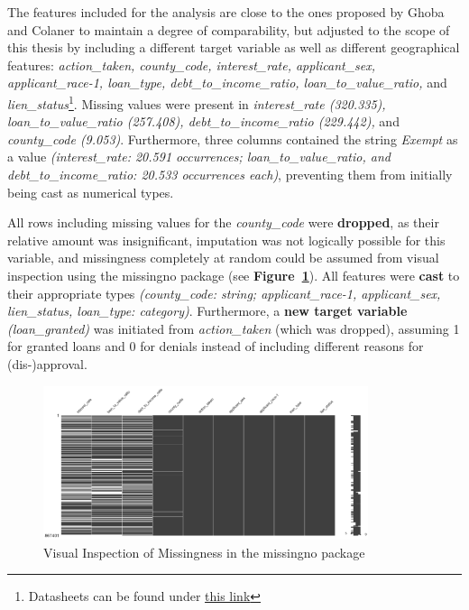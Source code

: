 The features included for the analysis are close to the ones proposed by Ghoba and Colaner to maintain a degree of comparability, but adjusted to the scope of this thesis by including a different target variable as well as different geographical features: 
\textit{action\_taken, county\_code, interest\_rate, applicant\_sex, applicant\_race-1, loan\_type, debt\_to\_income\_ratio, loan\_to\_value\_ratio,} and \textit{lien\_status}\footnote{Datasheets can be found under \href{https://ffiec.cfpb.gov/documentation/publications/loan-level-datasets/lar-data-fields}{this link}}. 
Missing values were present in \textit{interest\_rate (320.335), loan\_to\_value\_ratio (257.408), debt\_to\_income\_ratio (229.442),} and \textit{county\_code (9.053)}. 
Furthermore, three columns contained the string \textit{Exempt} as a value \textit{(interest\_rate: 20.591 occurrences; loan\_to\_value\_ratio, and debt\_to\_income\_ratio: 20.533 occurrences each)}, preventing them from initially being cast as numerical types.

All rows including missing values for the \textit{county\_code} were \textbf{dropped}, as their relative amount was insignificant, imputation was not logically possible for this variable, and missingness completely at random could be assumed from visual inspection using the missingno package (see \textbf{Figure~\ref{fig:CH03_Missingno_Completeness}}). 
All features were \textbf{cast} to their appropriate types \textit{(county\_code: string; applicant\_race-1, applicant\_sex, lien\_status, loan\_type: category)}. Furthermore, a \textbf{new target variable} \textit{(loan\_granted)} was initiated from \textit{action\_taken} (which was dropped), assuming 1 for granted loans and 0 for denials instead of including different reasons for (dis-)approval.

\begin{figure}[h]
    \centering
    \includegraphics[width=0.85\textwidth]{images/CH03_Missingno_Completeness.png}
    \caption{Visual Inspection of Missingness in the missingno package}
    \label{fig:CH03_Missingno_Completeness}
\end{figure}

